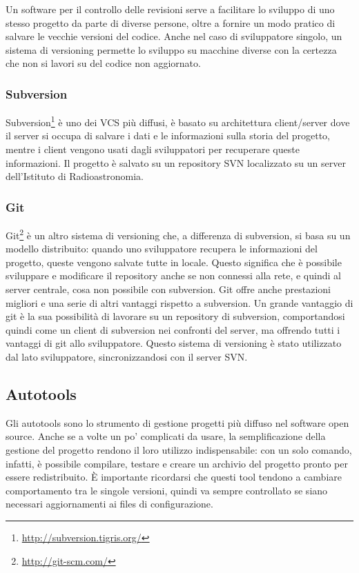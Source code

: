 Un software per il controllo delle revisioni serve a facilitare lo sviluppo di
uno stesso progetto da parte di diverse persone, oltre a fornire un modo pratico
di salvare le vecchie versioni del codice. Anche nel caso di sviluppatore
singolo, un sistema di versioning permette lo sviluppo su macchine diverse con
la certezza che non si lavori su del codice non aggiornato.

\subsubsection{Subversion}
Subversion\footnote{\url{http://subversion.tigris.org/}} \`e uno dei VCS pi\`u
diffusi, \`e basato su architettura client/server dove il server si occupa di
salvare i dati e le informazioni sulla storia del progetto, mentre i client
vengono usati dagli sviluppatori per recuperare queste informazioni. Il progetto
\`e salvato su un repository SVN localizzato su un server dell'Istituto di
Radioastronomia.

\subsubsection{Git}
Git\footnote{\url{http://git-scm.com/}} \`e un altro sistema di versioning che,
a differenza di subversion, si basa su un modello distribuito: quando uno
sviluppatore recupera le informazioni del progetto, queste vengono salvate tutte
in locale. Questo significa che \`e possibile sviluppare e modificare il
repository anche se non connessi alla rete, e quindi al server centrale, cosa
non possibile con subversion. Git offre anche prestazioni migliori e una serie
di altri vantaggi rispetto a subversion. Un grande vantaggio di git \`e la sua
possibilit\`a di lavorare su un repository di subversion, comportandosi quindi
come un client di subversion nei confronti del server, ma offrendo tutti i
vantaggi di git allo sviluppatore. Questo sistema di versioning \`e stato
utilizzato dal lato sviluppatore, sincronizzandosi con il server SVN.

\subsection{Autotools}
Gli autotools sono lo strumento di gestione progetti più diffuso nel software
open source. Anche se a volte un po' complicati da usare, la semplificazione
della gestione del progetto rendono il loro utilizzo indispensabile: con un
solo comando, infatti, \`e possibile compilare, testare e creare un archivio del
progetto pronto per essere redistribuito. \`E importante ricordarsi che questi
tool tendono a cambiare comportamento tra le singole versioni, quindi va sempre
controllato se siano necessari aggiornamenti ai files di configurazione.

